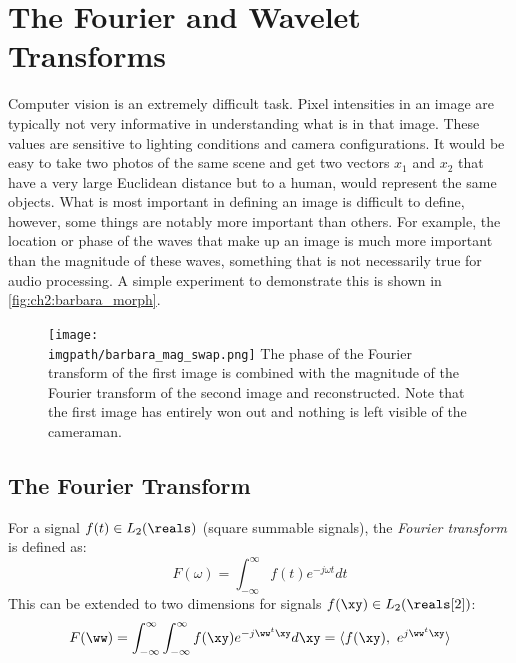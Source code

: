 \section{The Fourier and Wavelet Transforms}\label{sec:ch2:fourier}

  Computer vision is an extremely difficult task. Pixel intensities in an image are
  typically not very informative in understanding what is in that image.
  These values are sensitive to lighting conditions and camera configurations.
  It would be easy to take two photos of the same scene and get two vectors
  $x_1$ and $x_2$ that have a very large Euclidean distance but to a human,
  would represent the same objects. What is most important in defining an image is
  difficult to define, however, some things are notably more important than
  others. For example, the location or phase of the waves that make up an
  image is much more important than the magnitude of these waves, something
  that is not necessarily true for audio processing. A simple experiment to
  demonstrate this is shown in \autoref{fig:ch2:barbara_morph}.
  \begin{figure}
    \centering
      \texttt{[image: \\imgpath/barbara\_mag\_swap.png]}
        {The phase of the Fourier transform of the first image is combined with
        the magnitude of the Fourier transform of the second image and
        reconstructed. Note that the first image has entirely won out and
        nothing is left visible of the cameraman.}
      \label{fig:ch2:barbara_morph}
  \end{figure}

\subsection{The Fourier Transform}
For a signal $f(t) \in L_2(\reals)$ (square summable signals), the \emph{Fourier
transform} is defined as:
\begin{equation}
  F(\omega) = \int_{-\infty}^{\infty} f(t) e^{-j\omega t} dt
\end{equation}
This can be extended to two dimensions for signals $f(\xy) \in L_2(\reals[2])$:
\begin{equation}
  F(\ww) = \int_{-\infty}^{\infty}\int_{-\infty}^{\infty} f(\xy) e^{-j\ww^t \xy} d\xy = \langle f(\xy),\ e^{j\ww^t \xy} \rangle
\end{equation}

